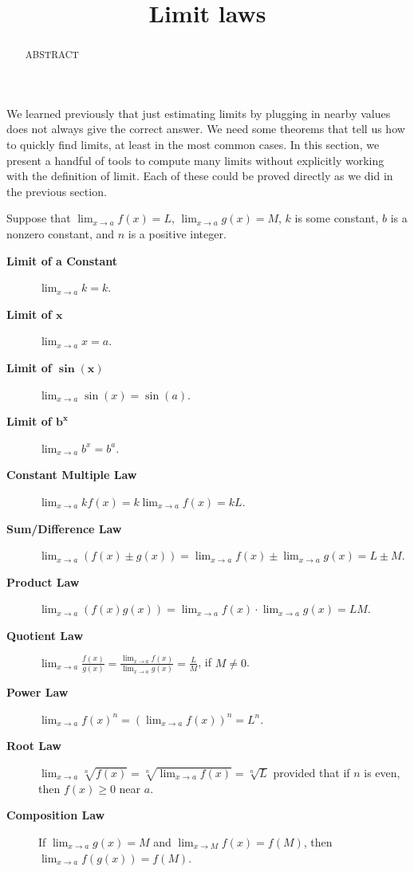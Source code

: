 \documentclass{ximera}
\title{Limit laws}
\begin{document}
\begin{abstract}
ABSTRACT
\end{abstract}
\maketitle

We learned previously that just estimating limits by plugging in
nearby values does not always give the correct answer.  We need some
theorems that tell us how to quickly find limits, at least in the most
common cases.  In this section, we present a handful of tools to
compute many limits without explicitly working with the definition of
limit. Each of these could be proved directly as we did in the
previous section.

\begin{theorem}\label{theorem:limit-laws}
Suppose that $\lim_{x\to a}f(x)=L$, $\lim_{x\to a}g(x)=M$, $k$ is some
constant, $b$ is a nonzero constant, and $n$ is a positive integer.
\begin{description}
\item[\textbf{Limit of a Constant}] $\lim_{x\to a} k = k$.
\item[\textbf{Limit of $\boldsymbol{x}$}] $\lim_{x\to a}x =a$.
\item[\textbf{Limit of $\boldsymbol{\sin(x)}$}] $\lim_{x\to a} \sin(x) = \sin(a)$.
\item[\textbf{Limit of $\boldsymbol{b^x}$}] $\lim_{x\to a} b^x = b^a$.
\item[\textbf{Constant Multiple Law}] $\lim_{x\to a} kf(x) = k\lim_{x\to a}f(x)=kL$.
\item[\textbf{Sum/Difference Law}] $\lim_{x\to a} (f(x) \pm g(x)) = \lim_{x\to a}f(x) \pm \lim_{x\to a}g(x)=L \pm M$.  
\item[\textbf{Product Law}] $\lim_{x\to a} (f(x)g(x)) = \lim_{x\to a}f(x)\cdot\lim_{x\to a}g(x)=LM$. 
\item[\textbf{Quotient Law}] $\lim_{x\to a} \frac{f(x)}{g(x)} =
  \frac{\lim_{x\to a}f(x)}{\lim_{x\to a}g(x)}=\frac{L}{M}$, if $M\ne0$.
\item[\textbf{Power Law}] $\lim_{x\to a} f(x)^n = \left(\lim_{x\to a}f(x)\right)^n=L^n$. 
\item[\textbf{Root Law}] $\lim_{x\to a} \sqrt[n]{f(x)}= \sqrt[n]{\lim_{x\to  a}f(x)}=\sqrt[n]{L}$
  provided that if $n$ is even, then $f(x)\ge 0$ near $a$.
\item[\textbf{Composition Law}] If $\lim_{x\to a}g(x)=M$ and
  $\lim_{x\to M}f(x) = f(M)$, then $\lim_{x\to a} f(g(x)) = f(M)$.
\end{description}
\label{thm:limit laws}
\end{theorem}
\end{document}
